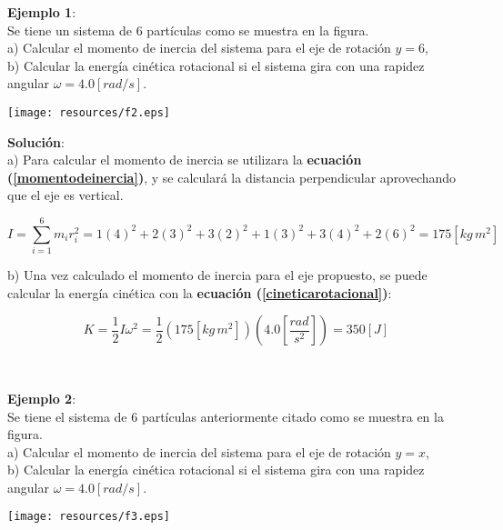 \documentclass[letter,twoside,11pt]{article}
\begin{document}
\begin{minipage}[b]{.4\linewidth}
\textbf{Ejemplo 1}:\\
Se tiene un sistema de 6 partículas como se muestra en la figura. \\

a) Calcular el momento de inercia del sistema para el eje de rotación $y = 6$, \\
b) Calcular la energía cinética rotacional si el sistema gira con una rapidez
angular $\omega = 4.0 [rad/s]$.
\end{minipage}\hfill
\begin{minipage}{.5\linewidth}
\texttt{[image: resources/f2.eps]}
\end{minipage}

\begin{minipage}[b]{.9\linewidth}
\textbf{Solución}:\\
a) Para calcular el momento de inercia se utilizara la \textbf{ecuación
(\ref{momentodeinercia})}, y se calculará la distancia perpendicular
aprovechando que el eje es vertical.

\begin{equation*}
    I = \sum_{i=1}^{6} m_i r^2_i = 1 (4)^2 + 2(3)^2 + 3(2)^2 + 1(3)^2 + 3(4)^2 + 2(6)^2 = 175 [kg\, m^2]
\end{equation*}

b) Una vez calculado el momento de inercia para el eje propuesto, se puede
calcular la energía cinética con la \textbf{ecuación
(\ref{cineticarotacional})}:

\begin{equation*}
    K = \frac{1}{2} I \omega^2 =  \frac{1}{2} \left(175 [kg\, m^2]\right) \left(4.0 \left[\frac{rad}{s^2}\right]\right) = 350 [J]
\end{equation*}
\end{minipage}
\\

\begin{minipage}[b]{.4\linewidth}
\textbf{Ejemplo 2}:\\
Se tiene el sistema de 6 partículas anteriormente citado como se muestra en la
figura. \\

a) Calcular el momento de inercia del sistema para el eje de rotación $y = x$, \\
b) Calcular la energía cinética rotacional si el sistema gira con una rapidez
angular $\omega = 4.0 [rad/s]$.
\end{minipage}\hfill
\begin{minipage}{.5\linewidth}
\texttt{[image: resources/f3.eps]}
\end{minipage}
\end{document}
